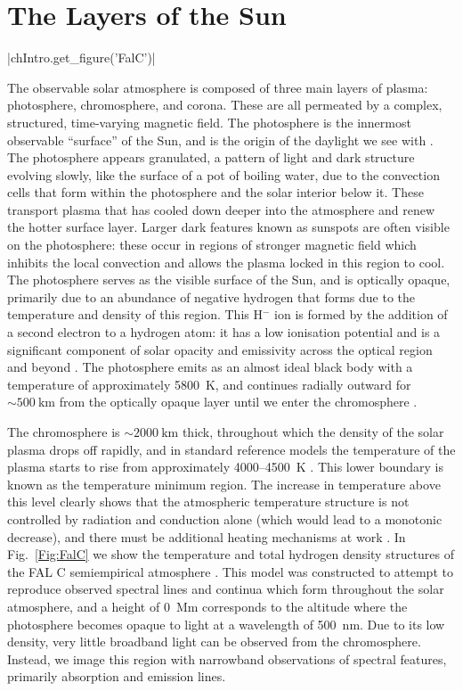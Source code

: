 \section{The Layers of the Sun}

\py[Intro]|chIntro.get_figure('FalC')|

The observable solar atmosphere is composed of three main layers of plasma: photosphere, chromosphere, and corona.
These are all permeated by a complex, structured, time-varying magnetic field.
The photosphere is the innermost observable ``surface'' of the Sun, and is the origin of the daylight we see with \citep{Zirin1992}.
The photosphere appears granulated, a pattern of light and dark structure evolving slowly, like the surface of a pot of boiling water, due to the convection cells that form within the photosphere and the solar interior below it.
These transport plasma that has cooled down deeper into the atmosphere and renew the hotter surface layer.
Larger dark features known as sunspots are often visible on the photosphere: these occur in regions of stronger magnetic field which inhibits the local convection and allows the plasma locked in this region to cool.
The photosphere serves as the visible surface of the Sun, and is optically opaque, primarily due to an abundance of negative hydrogen that forms due to the temperature and density of this region.
This H$^-$ ion is formed by the addition of a second electron to a hydrogen atom: it has a low ionisation potential and is a significant component of solar opacity and emissivity across the optical region and beyond \citep{Hubeny2014}.
The photosphere emits as an almost ideal black body with a temperature of approximately \SI{5800}{\kelvin}, and continues radially outward for $\sim\SI{500}{\kilo\metre}$ from the optically opaque layer until we enter the chromosphere \citep{Carroll2007}.


The chromosphere is $\sim\SI{2000}{\kilo\m}$ thick, throughout which the density of the solar plasma drops off rapidly, and in standard reference models the temperature of the plasma starts to rise from approximately 4000--\SI{4500}{\kelvin} \citep{Vernazza1981,Solanki2004}.
This lower boundary is known as the temperature minimum region.
The increase in temperature above this level clearly shows that the atmospheric temperature structure is not controlled by radiation and conduction alone (which would lead to a monotonic decrease), and there must be additional heating mechanisms at work \citep{Gurman1992}.
In Fig.~\ref{Fig:FalC} we show the temperature and total hydrogen density structures of the FAL C semiempirical atmosphere \citep{Fontenla1993}.
This model was constructed to attempt to reproduce observed spectral lines and continua which form throughout the solar atmosphere, and a height of \SI{0}{\mega\m} corresponds to the altitude where the photosphere becomes opaque to light at a wavelength of \SI{500}{\nano\m}.
Due to its low density, very little broadband light can be observed from the chromosphere.
Instead, we image this region with narrowband observations of spectral features, primarily absorption and emission lines.

